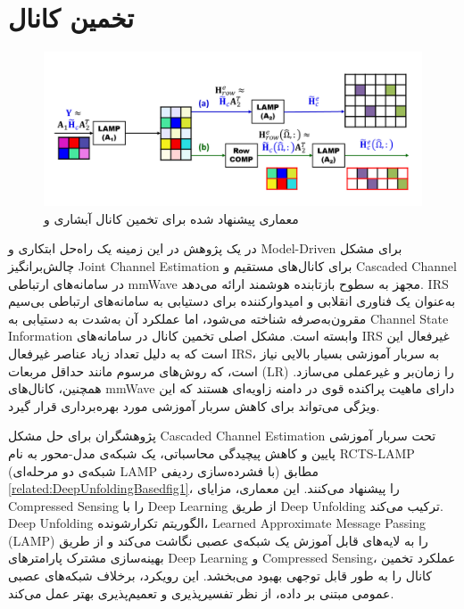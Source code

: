 \section{تخمین کانال}
\begin{figure}
	\centering
	\includegraphics[width=0.9\linewidth]{./Pic/DeepUnfoldingBased_fig1}
	\caption[ معماری پیشنهاد شده برای تخمین کانال آبشاری  و ]{معماری پیشنهاد شده برای تخمین کانال آبشاری  و  \cite{DeepUnfoldingBased}}
		\label{related:DeepUnfoldingBasedfig1}
\end{figure}
در یک پژوهش در این زمینه یک راه‌حل ابتکاری و 
\gls{Model-Driven}
برای مشکل چالش‌برانگیز 
\gls{Joint Channel Estimation}
 برای کانال‌های مستقیم و 
\gls{Cascaded Channel}
 در سامانه‌های ارتباطی mmWave مجهز به سطوح بازتابنده هوشمند ارائه می‌دهد. IRS به‌عنوان یک فناوری انقلابی و امیدوارکننده برای دستیابی به سامانه‌های ارتباطی بی‌سیم مقرون‌به‌صرفه شناخته می‌شود، اما عملکرد آن به‌شدت به دستیابی به 
\gls{Channel State Information}
 وابسته است.
	مشکل اصلی تخمین کانال در سامانه‌های IRS غیرفعال این است که به دلیل تعداد زیاد عناصر غیرفعال IRS، به سربار آموزشی بسیار بالایی نیاز است، که روش‌های مرسوم مانند حداقل مربعات 
(\gls{LR})
	 را زمان‌بر و غیرعملی می‌سازد. همچنین، کانال‌های mmWave دارای ماهیت پراکنده قوی در دامنه زاویه‌ای هستند که این ویژگی می‌تواند برای کاهش سربار آموزشی مورد بهره‌برداری قرار گیرد.
	 
	پژوهشگران برای حل مشکل 
\gls{Cascaded Channel Estimation}
	 تحت سربار آموزشی پایین و کاهش پیچیدگی محاسباتی، یک شبکه‌ی مدل-محور به نام 
\gls{RCTS-LAMP}
	  (شبکه‌ی دو مرحله‌ای LAMP با فشرده‌سازی ردیفی) مطابق 
\autoref{related:DeepUnfoldingBasedfig1}،
	   را پیشنهاد می‌کنند. این معماری، مزایای
\gls{Compressed Sensing}
	   را با 
\gls{Deep Learning}
	از طریق 
\gls{Deep Unfolding}
	ترکیب می‌کند.
\gls{Deep Unfolding}
	 الگوریتم تکرارشونده،
\gls{Learned Approximate Message Passing}
(LAMP) 
را به لایه‌های قابل آموزش یک شبکه‌ی عصبی نگاشت می‌کند و از طریق بهینه‌سازی مشترک پارامترهای 
	\gls{Deep Learning}
	و 
\gls{Compressed Sensing}،
	 عملکرد تخمین کانال را به طور قابل توجهی بهبود می‌بخشد. این رویکرد، برخلاف شبکه‌های عصبی عمومی مبتنی بر داده، از نظر تفسیرپذیری و تعمیم‌پذیری بهتر عمل می‌کند.
	 
